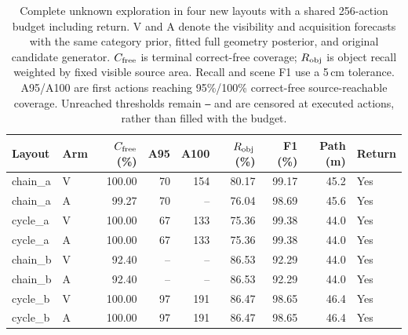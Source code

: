 \begin{table}[t]
\centering
\caption{Complete unknown exploration in four new layouts with a shared 256-action budget including return. V and A denote the visibility and acquisition forecasts with the same category prior, fitted full geometry posterior, and original candidate generator. $C_{\rm free}$ is terminal correct-free coverage; $R_{\rm obj}$ is object recall weighted by fixed visible source area. Recall and scene F1 use a 5\,cm tolerance. A95/A100 are first actions reaching 95\%/100\% correct-free source-reachable coverage. Unreached thresholds remain \texttt{--} and are censored at executed actions, rather than filled with the budget.}
\label{tab:b11-complete-policy}
\small
\setlength{\tabcolsep}{3.5pt}
\begin{tabular}{llrrrrrrl}
\toprule
Layout & Arm & $C_{\rm free}$ (\%) & A95 & A100 & $R_{\rm obj}$ (\%) & F1 (\%) & Path (m) & Return \\
\midrule
chain\_a & V & 100.00 & 70 & 154 & 80.17 & 99.17 & 45.2 & Yes \\
chain\_a & A & 99.27 & 70 & -- & 76.04 & 98.69 & 45.6 & Yes \\
cycle\_a & V & 100.00 & 67 & 133 & 75.36 & 99.38 & 44.0 & Yes \\
cycle\_a & A & 100.00 & 67 & 133 & 75.36 & 99.38 & 44.0 & Yes \\
chain\_b & V & 92.40 & -- & -- & 86.53 & 92.29 & 44.0 & Yes \\
chain\_b & A & 92.40 & -- & -- & 86.53 & 92.29 & 44.0 & Yes \\
cycle\_b & V & 100.00 & 97 & 191 & 86.47 & 98.65 & 46.4 & Yes \\
cycle\_b & A & 100.00 & 97 & 191 & 86.47 & 98.65 & 46.4 & Yes \\
\bottomrule
\end{tabular}
\end{table}
